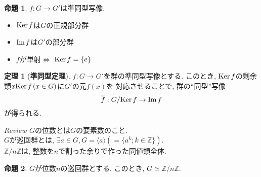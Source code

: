 \documentclass[a4j,dvipdfmx]{jsarticle}
\newcommand{\Ker}{{\rm{Ker}}\hspace{0.5mm}}
\renewcommand{\Im}{{\rm{Im}}\hspace{0.5mm}}
\theoremstyle{definition}
\theoremstyle{definition}
\newtheorem{theorem}{定理}
\theoremstyle{definition}
\newtheorem{proposition}{命題}
\begin{document}
            \begin{proposition} $f:G\to G'$は準同型写像.
                \begin{itemize}
                    \item $\Ker f$は$G$の正規部分群
                    \item $\Im f$は$G'$の部分群
                    \item $f$が単射$\Leftrightarrow$ $\Ker f=\{e\}$
                \end{itemize}
            \end{proposition}

            \begin{theorem}[\textbf{準同型定理}]
                $f:G\to G'$を群の準同型写像とする. このとき, $\Ker f$の剰余類$x\Ker f \hspace{0.5mm}(x\in G)$に$G'$の元$f(x)$を
                対応させることで, 群の``同型''写像
                \begin{equation}
                    \overline{f}:G/\Ker f \to \Im f
                \end{equation}
                が得られる.
            \end{theorem}

            \begin{itembox}[l]{$Review$}
                $G$の位数とは$G$の要素数のこと.\\
                $G$が巡回群とは, $\exists a\in G,G=\langle a \rangle(=\{a^{k};k\in\mathbb{Z}\})$.\\
                $\mathbb{Z}/n\mathbb{Z}$は, 整数を$n$で割った余りで作った同値類全体.
            \end{itembox}
            
            \begin{proposition}
                $G$が位数$n$の巡回群とする. このとき, $G\simeq \mathbb{Z}/n\mathbb{Z}$.
            \end{proposition}
\end{document}
